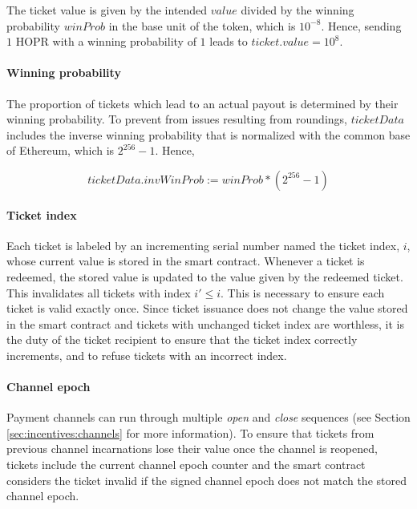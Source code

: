 The ticket value is given by the intended $value$ divided by the winning probability $winProb$ in the base unit of the token, which is $10^{-8}$. Hence, sending $1$ HOPR with a winning probability of $1$ leads to $ticket.value = 10^8$.

\paragraph{Winning probability}
\label{sec:tickets:issuance:winningprobability}

The proportion of tickets which lead to an actual payout is determined by their winning probability. To prevent from issues resulting from roundings, $ticketData$ includes the inverse winning probability that is normalized with the common base of Ethereum, which is $2^{256} - 1$. Hence,

$$ ticketData.invWinProb := winProb * (2^{256} -1)$$

\paragraph{Ticket index}
\label{sec:tickets:issuance:ticketindex}

Each ticket is labeled by an incrementing serial number named the ticket index, $i$, whose current value is stored in the smart contract. Whenever a ticket is redeemed, the stored value is updated to the value given by the redeemed ticket. This invalidates all tickets with index $i' \le i$. This is necessary to ensure each ticket is valid exactly once. Since ticket issuance does not change the value stored in the smart contract and tickets with unchanged ticket index are worthless, it is the duty of the ticket recipient to ensure that the ticket index correctly increments, and to refuse tickets with an incorrect index.

\paragraph{Channel epoch}
\label{sec:tickets:issuance:channelepoch}

Payment channels can run through multiple \textit{open} and \textit{close} sequences (see Section \ref{sec:incentives:channels} for more information). To ensure that tickets from previous channel incarnations lose their value once the channel is reopened, tickets include the current channel epoch counter and the smart contract considers the ticket invalid if the signed channel epoch does not match the stored channel epoch.

